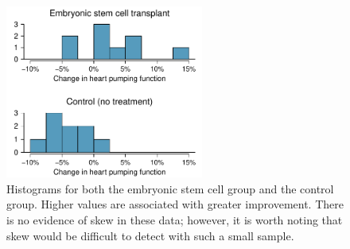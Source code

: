 \begin{figure}[h]
\centering
\includegraphics[width=0.58\textwidth]{ch_inference_for_means_oi_biostat/figures/stemCellTherapyForHearts/stemCellTherapyForHearts}
\caption{Histograms for both the embryonic stem cell group and the control group. Higher values are associated with greater improvement. There is no evidence of skew in these data; however, it is worth noting that skew would be difficult to detect with such a small sample.}
\label{stemCellTherapyForHearts}
\end{figure}



